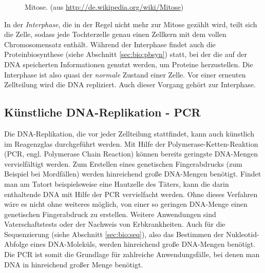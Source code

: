 \begin{figure}[htb]
\begin{center}
\end{center}
\caption{Mitose. (aus \protect\url{http://de.wikipedia.org/wiki/Mitose})}
\label{fig:bio:zell:mitose}
\end{figure}

In der \emph{Interphase}, die in der Regel nicht mehr zur Mitose gezählt wird, teilt sich die Zelle, sodass jede Tochterzelle genau einen Zellkern mit dem vollen Chromosomensatz enthält. Während der Interphase findet auch die Proteinbiosynthese (siehe Abschnitt \ref{sec:bio:pbsyn}) statt, bei der die auf der DNA speicherten Informationen genutzt werden, um Proteine herzustellen. Die Interphase ist also quasi der \textit{normale} Zustand einer Zelle. Vor einer erneuten Zellteilung wird die DNA repliziert. Auch dieser Vorgang gehört zur Interphase.

\subsection{Künstliche DNA-Replikation - PCR}
\label{sec:bio:zell:pcr}

Die DNA-Replikation, die vor jeder Zellteilung stattfindet, kann auch künstlich im Reagenzglas durchgeführt werden. Mit Hilfe der Polymerase-Ketten-Reaktion (PCR, engl. Polymerase Chain Reaction) können bereits geringste DNA-Mengen vervielfältigt werden. Zum Erstellen eines genetischen Fingerabdrucks (zum Beispiel bei Mordfällen) werden hinreichend große DNA-Mengen benötigt. Findet man am Tatort beispielsweise eine Hautzelle des Täters, kann die darin enthaltende DNA mit Hilfe der PCR vervielfacht werden. Ohne dieses Verfahren wäre es nicht ohne weiteres möglich, von einer so geringen DNA-Menge einen genetischen Fingerabdruck zu erstellen. Weitere Anwendungen sind Vaterschaftstests oder der Nachweis von Erbkrankheiten. Auch für die Sequenzierung (siehe Abschnitt \ref{sec:bio:seq}), also das Bestimmen der Nukleotid-Abfolge eines DNA-Moleküls, werden hinreichend große DNA-Mengen benötigt. Die PCR ist somit die Grundlage für zahlreiche Anwendungsfälle, bei denen man DNA in hinreichend großer Menge benötigt. 

